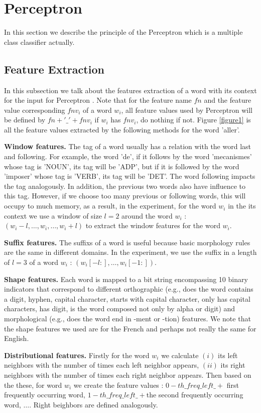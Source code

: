 \documentclass{article}
\begin{document}
\section{Perceptron}
In this section we describe the principle of the Perceptron which is a multiple class classifier actually.

\subsection{Feature Extraction}
In this subsection we talk about the features extraction of a word with its context for the input for Perceptron \cite{schnabel2014flors}. Note that for the feature name $fn$ and  the feature value corresponding $fnv_i$ of a word $w_i$, all feature values used by Perceptron will be defined by $fn + '\_' + fnv_i$ if $w_i$ has $fnv_i$, do nothing if not. Figure \ref{figure1} is all the feature values extracted by the following methods for the word 'aller'.

\textbf{Window features.} The tag of a word usually has a relation with the word last and following. For example, the word 'de', if it follows by the word 'mecanismes' whose tag is 'NOUN', its tag will be 'ADP', but if it is followed by the word 'imposer' whose tag is 'VERB', its tag will be 'DET'. The word following impacts the tag analogously. In addition, the previous two words also have influence to this tag. However, if we choose too many previous or following words, this will occupy to much memory, as a result, in the experiment, for the word $w_i$ in the its context we use a window of size $l = 2$ around the word $w_i$ : $(w_i-l,\dots, w_i,\dots, w_i+l )$ to extract the window features for the word $w_i$.

\textbf{Suffix features.} The suffixs of a word is useful because basic morphology rules are the same in different domains. In the experiment, we use the suffix in a length of $l = 3$ of a word $w_i$ : $(w_i[-l:],\dots,w_i[-1:])$. 

\textbf{Shape features.} Each word is mapped to a bit string encompassing 10 binary indicators that correspond to different orthographic (e.g., does the word contains a digit, hyphen, capital character, starts with capital character, only has capital characters, has digit, is the word composed not only by alpha or digit) and morphological (e.g., does the word end in -ment or -tion) features. We note that the shape features we used are for the French and perhaps not really the same for English. 

\textbf{Distributional features.} Firstly for the word $w_i$ we calculate $(i)$ its left neighbors with the number of times each left neighbor appears, $(ii)$ its right neighbors with the number of times each right neighbor appears. Then based on the these, for word $w_i$  we create the feature values : $0-th\_freq\_left\_ +$ first frequently occurring word, $1-th\_freq\_left\_ +$the second frequently occurring word, $\dots$. Right beighbors are defined analogously.
\end{document}
